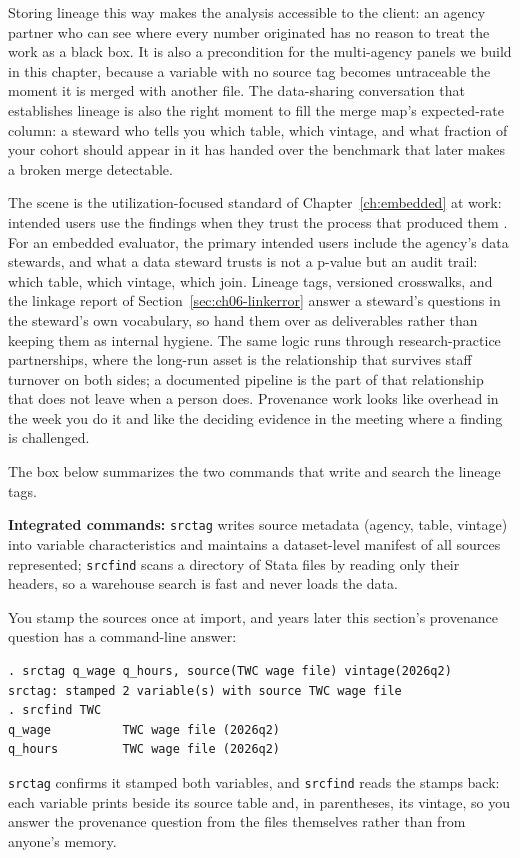 \documentclass[
    a4paper,
    fontsize=10pt,
    twoside=true,
    numbers=noenddot,
]{kaobook}
\begin{document}
Storing lineage this way makes the analysis accessible to the client: an agency partner who can see where every number originated has no reason to treat the work as a black box. It is also a precondition for the multi-agency panels we build in this chapter, because a variable with no source tag becomes untraceable the moment it is merged with another file. The data-sharing conversation that establishes lineage is also the right moment to fill the merge map's expected-rate column: a steward who tells you which table, which vintage, and what fraction of your cohort should appear in it has handed over the benchmark that later makes a broken merge detectable.

The scene is the utilization-focused standard of Chapter~\ref{ch:embedded} at work: intended users use the findings when they trust the process that produced them \parencite{patton2008utilization}. For an embedded evaluator, the primary intended users include the agency's data stewards, and what a data steward trusts is not a p-value but an audit trail: which table, which vintage, which join. Lineage tags, versioned crosswalks, and the linkage report of Section~\ref{sec:ch06-linkerror} answer a steward's questions in the steward's own vocabulary, so hand them over as deliverables rather than keeping them as internal hygiene. The same logic runs through research-practice partnerships, where the long-run asset is the relationship that survives staff turnover on both sides; a documented pipeline is the part of that relationship that does not leave when a person does. Provenance work looks like overhead in the week you do it and like the deciding evidence in the meeting where a finding is challenged.

The box below summarizes the two commands that write and search the lineage tags.

\begin{kaobox}[frametitle=Package Integration: \texttt{srctag} and \texttt{srcfind}]
\textbf{Integrated commands:} \texttt{srctag} writes source metadata (agency, table, vintage) into variable characteristics and maintains a dataset-level manifest of all sources represented; \texttt{srcfind} scans a directory of Stata files by reading only their headers, so a warehouse search is fast and never loads the data.
\end{kaobox}

You stamp the sources once at import, and years later this section's provenance question has a command-line answer:
\par
{\footnotesize
\begin{verbatim}
. srctag q_wage q_hours, source(TWC wage file) vintage(2026q2)
srctag: stamped 2 variable(s) with source TWC wage file
. srcfind TWC
q_wage          TWC wage file (2026q2)
q_hours         TWC wage file (2026q2)
\end{verbatim}
}
\texttt{srctag} confirms it stamped both variables, and \texttt{srcfind} reads the stamps back: each variable prints beside its source table and, in parentheses, its vintage, so you answer the provenance question from the files themselves rather than from anyone's memory.
\end{document}
